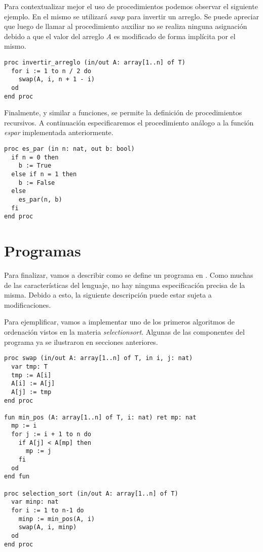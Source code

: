 \documentclass{article}
\begin{document}
Para contextualizar mejor el uso de procedimientos podemos observar el siguiente ejemplo.
En el mismo se utilizará \textit{swap} para invertir un arreglo.
Se puede apreciar que luego de llamar al procedimiento auxiliar no se realiza ninguna asignación debido a que el valor del arreglo \textit{A} es modificado de forma implícita por el mismo.

\begin{lstlisting}
proc invertir_arreglo (in/out A: array[1..n] of T)
  for i := 1 to n / 2 do
    swap(A, i, n + 1 - i)
  od
end proc
\end{lstlisting}

Finalmente, y similar a funciones, se permite la definición de procedimientos recursivos.
A continuación especificaremos el procedimiento análogo a la función \textit{es\gbajo par} implementada anteriormente.

\begin{lstlisting}
proc es_par (in n: nat, out b: bool)
  if n = 0 then
    b := True
  else if n = 1 then
    b := False
  else
    es_par(n, b)
  fi
end proc
\end{lstlisting}

\section{Programas}

Para finalizar, vamos a describir como se define un programa en \Lang.
Como muchas de las características del lenguaje, no hay ninguna especificación precisa de la misma.
Debido a esto, la siguiente descripción puede estar sujeta a modificaciones.

Para ejemplificar, vamos a implementar uno de los primeros algoritmos de ordenación vistos en la materia \textit{selection\gbajo sort}.
Algunas de las componentes del programa ya se ilustraron en secciones anteriores.

\begin{lstlisting}
proc swap (in/out A: array[1..n] of T, in i, j: nat)
  var tmp: T
  tmp := A[i]
  A[i] := A[j]
  A[j] := tmp
end proc

fun min_pos (A: array[1..n] of T, i: nat) ret mp: nat
  mp := i
  for j := i + 1 to n do
    if A[j] < A[mp] then
      mp := j
    fi
  od
end fun

proc selection_sort (in/out A: array[1..n] of T)
  var minp: nat
  for i := 1 to n-1 do
    minp := min_pos(A, i)
    swap(A, i, minp)
  od
end proc
\end{lstlisting}
\end{document}
